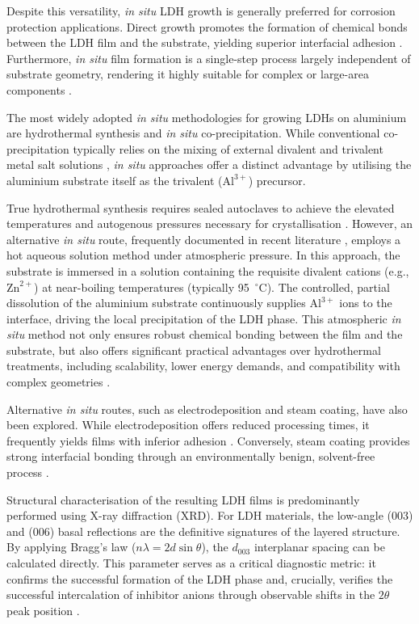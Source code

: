 \documentclass[11pt,twoside,a4paper,final]{report}
\begin{document}
Despite this versatility, \textit{in situ} LDH growth is generally preferred for corrosion protection applications. Direct growth promotes the formation of chemical bonds between the LDH film and the substrate, yielding superior interfacial adhesion \cite{BoualiReview2020, Cao2022, Guo2009}. Furthermore, \textit{in situ} film formation is a single-step process largely independent of substrate geometry, rendering it highly suitable for complex or large-area components \cite{Guo2009, BoualiReview2020}.

The most widely adopted \textit{in situ} methodologies for growing LDHs on aluminium are hydrothermal synthesis and \textit{in situ} co-precipitation. While conventional co-precipitation typically relies on the mixing of external divalent and trivalent metal salt solutions \cite{BoualiReview2020}, \textit{in situ} approaches offer a distinct advantage by utilising the aluminium substrate itself as the trivalent ($\mathrm{Al}^{3+}$) precursor. 

True hydrothermal synthesis requires sealed autoclaves to achieve the elevated temperatures and autogenous pressures necessary for crystallisation \cite{Guo2009}. However, an alternative \textit{in situ} route, frequently documented in recent literature \cite{Bouali2021}, employs a hot aqueous solution method under atmospheric pressure. In this approach, the substrate is immersed in a solution containing the requisite divalent cations (e.g., $\mathrm{Zn}^{2+}$) at near-boiling temperatures (typically 95~$^\circ$C). The controlled, partial dissolution of the aluminium substrate continuously supplies $\mathrm{Al}^{3+}$ ions to the interface, driving the local precipitation of the LDH phase. This atmospheric \textit{in situ} method not only ensures robust chemical bonding between the film and the substrate, but also offers significant practical advantages over hydrothermal treatments, including scalability, lower energy demands, and compatibility with complex geometries \cite{Cao2022,Bouali2021}.

Alternative \textit{in situ} routes, such as electrodeposition and steam coating, have also been explored. While electrodeposition offers reduced processing times, it frequently yields films with inferior adhesion \cite{He2020, Cao2022}. Conversely, steam coating provides strong interfacial bonding through an environmentally benign, solvent-free process \cite{Pan2023, Cao2022}.

Structural characterisation of the resulting LDH films is predominantly performed using X-ray diffraction (XRD). For LDH materials, the low-angle (003) and (006) basal reflections are the definitive signatures of the layered structure. By applying Bragg's law ($n\lambda = 2d\sin\theta$), the $d_{003}$ interplanar spacing can be calculated directly. This parameter serves as a critical diagnostic metric: it confirms the successful formation of the LDH phase and, crucially, verifies the successful intercalation of inhibitor anions through observable shifts in the $2\theta$ peak position \cite{Zhou2017, Cao2022}.
\end{document}

